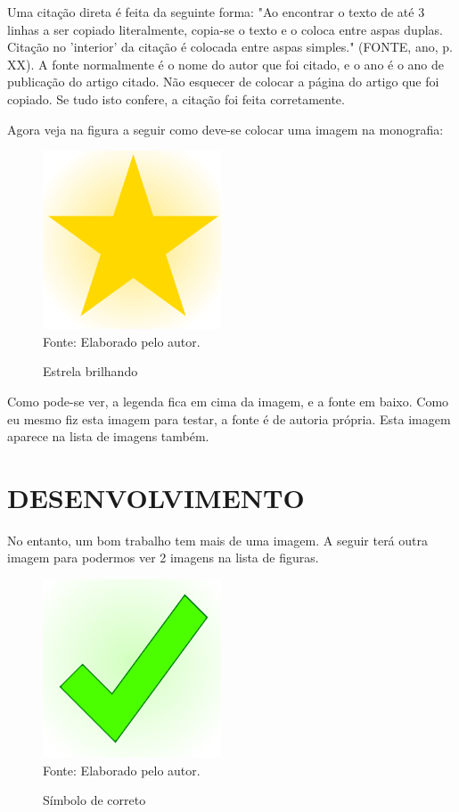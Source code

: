 \documentclass[12pt,a4paper]{article}
\newcommand{\source}[1]{\small Fonte: {#1}}
\begin{document}
	Uma citação direta é feita da seguinte forma:
	"Ao encontrar o texto de até 3 linhas a ser copiado literalmente, copia-se o texto e o coloca entre aspas duplas. Citação no 'interior' da citação é colocada entre aspas simples." (FONTE, ano, p. XX).
	A fonte normalmente é o nome do autor que foi citado, e o ano é o ano de publicação do artigo citado.
	Não esquecer de colocar a página do artigo que foi copiado.
	Se tudo isto confere, a citação foi feita corretamente.
	
	Agora veja na figura a seguir como deve-se colocar uma imagem na monografia:
	
\begin{figure}[ht!]
	\label{estrela}
	\caption{Estrela brilhando}
	\centering
	\includegraphics[scale=0.5]{Star.png}\\
	\vspace{0.5mm}
	\source{Elaborado pelo autor.}
\end{figure}

	Como pode-se ver, a legenda fica em cima da imagem, e a fonte em baixo.
	Como eu mesmo fiz esta imagem para testar, a fonte é de autoria própria.
	Esta imagem aparece na lista de imagens também.

\clearpage %
\section{DESENVOLVIMENTO}
	No entanto, um bom trabalho tem mais de uma imagem.
	A seguir terá outra imagem para podermos ver 2 imagens na lista de figuras.

\begin{figure}[ht!]
	\label{correto}
	\caption{Símbolo de correto}
	\centering
	\includegraphics[scale=0.5]{Okay.png}\\
	\vspace{0.5mm}
	\source{Elaborado pelo autor.}
\end{figure}
\end{document}
